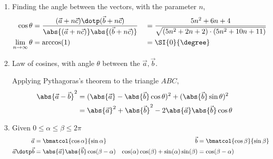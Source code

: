 \begin{enumerate}
    \item Finding the angle between the vectors, with the parameter $ n $,
          \begin{align}
              \cos \theta                 & = \frac{(\vec{a} + n\vec{c}) \dotp
                  (\vec{b} + n\vec{c})}
              {\abs{(\vec{a} + n\vec{c})}
              \abs{(\vec{b} + n\vec{c})}} &
                                          & =\frac{5n^2 + 6n + 4}
              {\sqrt{(5n^2 + 2n + 2) \cdot (5n^2 + 10n + 11)}}                   \\
              \lim_{n \to \infty}\theta   & = \arccos(1)                       &
                                          & = \SI{0}{\degree}
          \end{align}

    \item Law of cosines, with angle $ \theta $ between the $ \vec{a}, \vec{b} $. \par
          Applying Pythagoras's theorem to the triangle $ ABC $,
          \begin{align}
              \abs{\vec{a} - \vec{b}}^2 & = (\abs{\vec{a}} -
              \abs{\vec{b}}\cos \theta)^2 + (\abs{\vec{b}}\sin \theta)^2      \\
                                        & = \abs{\vec{a}}^2 + \abs{\vec{b}}^2
              - 2\abs{\vec{a}} \abs{\vec{b}} \cos \theta
          \end{align}
          \begin{figure}[H]
              \centering
          \end{figure}

    \item Given $ 0 \leq \alpha \leq \beta \leq 2\pi $
          \begin{align}
              \vec{a}                                            &
              = \bmatcol{\cos \alpha}{\sin \alpha}               & \vec{b} &
              = \bmatcol{\cos \beta}{\sin \beta}                             \\
              \vec{a} \dotp \vec{b}                              &
              = \abs{\vec{a}} \abs{\vec{b}} \cos(\beta - \alpha) &
              \cos(\alpha)\cos(\beta) + \sin(\alpha)\sin(\beta)  & =
              \cos(\beta - \alpha)
          \end{align}


\end{enumerate}
